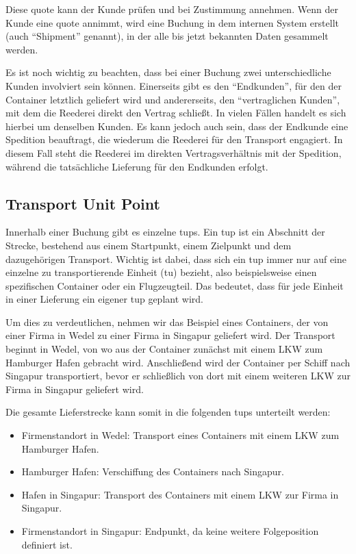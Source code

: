 Diese \gls{quote} kann der Kunde prüfen und bei Zustimmung annehmen. 
Wenn der Kunde eine \gls{quote} annimmt, wird eine Buchung in dem internen System erstellt (auch \enquote{Shipment} genannt), in der alle bis jetzt bekannten Daten gesammelt werden. 

Es ist noch wichtig zu beachten, dass bei einer Buchung zwei unterschiedliche Kunden involviert sein können. Einerseits gibt es den \enquote{Endkunden}, für den der Container letztlich geliefert wird und andererseits, den \enquote{vertraglichen Kunden}, mit dem die Reederei direkt den Vertrag schließt. 
In vielen Fällen handelt es sich hierbei um denselben Kunden. Es kann jedoch auch sein, dass der Endkunde eine Spedition beauftragt, die wiederum die Reederei für den Transport engagiert. In diesem Fall steht die Reederei im direkten Vertragsverhältnis mit der Spedition, während die tatsächliche Lieferung für den Endkunden erfolgt.


\subsection{Transport Unit Point}
 Innerhalb einer Buchung gibt es einzelne \glspl{tup}. Ein \gls{tup} ist ein Abschnitt der Strecke, bestehend aus einem Startpunkt, einem Zielpunkt und dem dazugehörigen Transport. Wichtig ist dabei, dass sich ein \gls{tup} immer nur auf eine einzelne zu transportierende Einheit (\acrshort{tu}) bezieht, also beispielsweise einen spezifischen Container oder ein Flugzeugteil. Das bedeutet, dass für jede Einheit in einer Lieferung ein eigener \gls{tup} geplant wird.

Um dies zu verdeutlichen, nehmen wir das Beispiel eines Containers, der von einer Firma in Wedel zu einer Firma in Singapur geliefert wird. Der Transport beginnt in Wedel, von wo aus der Container zunächst mit einem LKW zum Hamburger Hafen gebracht wird. Anschließend wird der Container per Schiff nach Singapur transportiert, bevor er schließlich von dort mit einem weiteren LKW zur Firma in Singapur geliefert wird.

\pagebreak
Die gesamte Lieferstrecke kann somit in die folgenden \glspl{tup} unterteilt werden:
\begin{itemize}[noitemsep]
    \item Firmenstandort in Wedel: Transport eines Containers mit einem LKW zum Hamburger Hafen.
    \item Hamburger Hafen: Verschiffung des Containers nach Singapur.
    \item Hafen in Singapur: Transport des Containers mit einem LKW zur Firma in Singapur.
    \item Firmenstandort in Singapur: Endpunkt, da keine weitere Folgeposition definiert ist.
\end{itemize}

